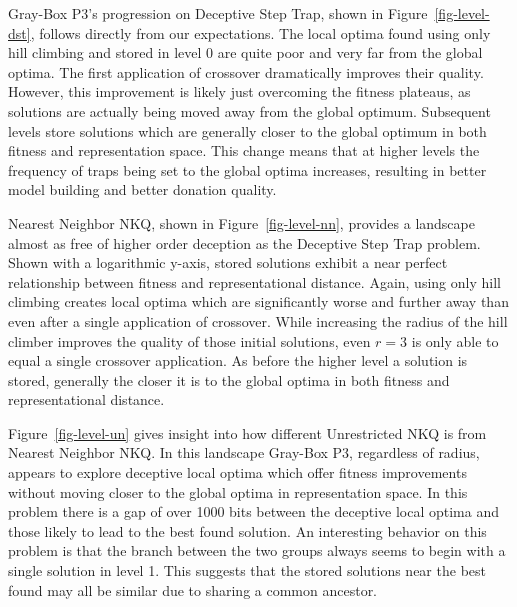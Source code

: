 Gray-Box P3's progression on Deceptive Step Trap, shown in Figure~\ref{fig-level-dst}, follows directly from our expectations.
The local optima found using only hill climbing and stored in level 0 are quite poor and very far from the global optima.
The first application of crossover dramatically improves their quality. However, this improvement is likely just overcoming
the fitness plateaus, as solutions are actually being moved away from the global optimum. Subsequent levels store solutions
which are generally closer to the global optimum in both fitness and representation space. This change means that at higher
levels the frequency of traps being set to the global optima increases, resulting in better model building and better donation quality.

\begin{figure*}
  \centering
  \caption{Distribution of local optima stored at each level of Gray-Box P3 in relation to the best found by the run on
           a Nearest Neighbor NKQ problem $N=6000$ and $K=4$.}
  \label{fig-level-nn}
\end{figure*}

Nearest Neighbor NKQ, shown in Figure~\ref{fig-level-nn}, provides a landscape almost as free of higher order deception
as the Deceptive Step Trap problem.  Shown with a logarithmic y-axis, stored solutions exhibit a near perfect relationship
between fitness and representational distance. Again, using only hill climbing creates local optima which are significantly
worse and further away than even
after a single application of crossover. While increasing the radius of the hill climber improves the quality of those initial
solutions, even $r=3$ is only able to equal a single crossover application. As before the higher level a solution is stored,
generally the closer it is to the global optima in both fitness and representational distance.

\begin{figure*}
  \centering
  \caption{Distribution of local optima stored at each level of Gray-Box P3 in relation to the best found by the run on
           an Unrestricted NKQ problem $N=6000$ and $K=4$.}
  \label{fig-level-un}
\end{figure*}

Figure~\ref{fig-level-un} gives insight into how different Unrestricted NKQ is from Nearest Neighbor NKQ. In this landscape
Gray-Box P3, regardless of radius, appears to explore deceptive local optima which offer fitness improvements without moving
closer to the global optima in representation space. In this problem there is a gap of over 1000 bits between the deceptive
local optima and those likely to lead to the best found solution. An interesting behavior on this problem is that the branch
between the two groups always seems to begin with a single solution in level 1. This suggests that the stored solutions near
the best found may all be similar due to sharing a common ancestor.

